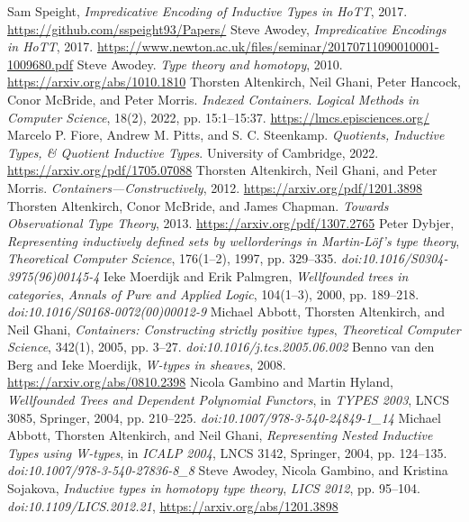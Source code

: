 \documentclass{article}
\begin{document}
\begin{thebibliography}{99}
 Sam Speight, \textit{Impredicative Encoding of Inductive Types in HoTT}, 2017. \url{https://github.com/sspeight93/Papers/}
 Steve Awodey, \textit{Impredicative Encodings in HoTT}, 2017. \url{https://www.newton.ac.uk/files/seminar/20170711090010001-1009680.pdf}
 Steve Awodey. \textit{Type theory and homotopy}, 2010. \url{https://arxiv.org/abs/1010.1810}
 Thorsten Altenkirch, Neil Ghani, Peter Hancock, Conor McBride, and Peter Morris. \textit{Indexed Containers}. \textit{Logical Methods in Computer Science}, 18(2), 2022, pp. 15:1--15:37. \url{https://lmcs.episciences.org/}
 Marcelo P. Fiore, Andrew M. Pitts, and S. C. Steenkamp. \textit{Quotients, Inductive Types, \& Quotient Inductive Types}. University of Cambridge, 2022. \url{https://arxiv.org/pdf/1705.07088}
 Thorsten Altenkirch, Neil Ghani, and Peter Morris. \textit{Containers—Constructively}, 2012. \url{https://arxiv.org/pdf/1201.3898}
 Thorsten Altenkirch, Conor McBride, and James Chapman. \textit{Towards Observational Type Theory}, 2013. \url{https://arxiv.org/pdf/1307.2765}
 Peter Dybjer, \textit{Representing inductively defined sets by wellorderings in Martin-Löf’s type theory}, \textit{Theoretical Computer Science}, 176(1–2), 1997, pp. 329–335. \textit{doi:10.1016/S0304-3975(96)00145-4}
 Ieke Moerdijk and Erik Palmgren, \textit{Wellfounded trees in categories}, \textit{Annals of Pure and Applied Logic}, 104(1–3), 2000, pp. 189–218. \textit{doi:10.1016/S0168-0072(00)00012-9}
 Michael Abbott, Thorsten Altenkirch, and Neil Ghani, \textit{Containers: Constructing strictly positive types}, \textit{Theoretical Computer Science}, 342(1), 2005, pp. 3–27. \textit{doi:10.1016/j.tcs.2005.06.002}
 Benno van den Berg and Ieke Moerdijk, \textit{W-types in sheaves}, 2008. \url{https://arxiv.org/abs/0810.2398}
 Nicola Gambino and Martin Hyland, \textit{Wellfounded Trees and Dependent Polynomial Functors}, in \textit{TYPES 2003}, LNCS 3085, Springer, 2004, pp. 210–225. \textit{doi:10.1007/978-3-540-24849-1\_14}
 Michael Abbott, Thorsten Altenkirch, and Neil Ghani, \textit{Representing Nested Inductive Types using W-types}, in \textit{ICALP 2004}, LNCS 3142, Springer, 2004, pp. 124–135. \textit{doi:10.1007/978-3-540-27836-8\_8}
 Steve Awodey, Nicola Gambino, and Kristina Sojakova, \textit{Inductive types in homotopy type theory}, \textit{LICS 2012}, pp. 95–104. \textit{doi:10.1109/LICS.2012.21}, \url{https://arxiv.org/abs/1201.3898}

\end{thebibliography}
\end{document}
